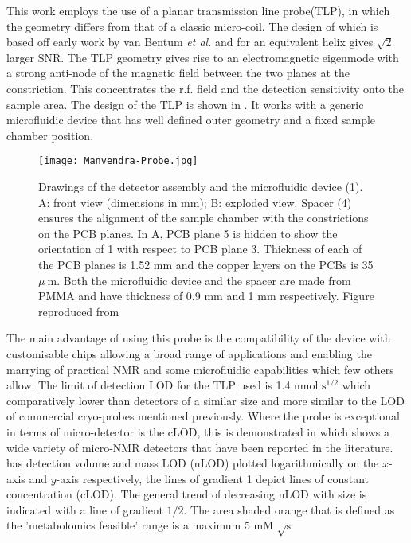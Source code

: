 This work employs the use of a planar transmission line probe(TLP)\citep{Finch:2016gv, RN164}, in which the geometry
differs from that of a classic micro-coil. The design of which is based off early work by van Bentum \textit{et
al.} and for an equivalent helix gives $\sqrt{2}$ larger SNR\citep{vanBentum:2007fda}. The TLP geometry gives rise
to an electromagnetic eigenmode with a strong anti-node of the magnetic field between the two planes
at the constriction. This concentrates the r.f. field and the detection sensitivity onto the sample area. The design of the TLP is shown in
. It works with a generic microfluidic device that has well defined outer geometry and a fixed sample
chamber position.
\begin{figure}
  \begin{center}
  \texttt{[image: Manvendra-Probe.jpg]}
  \end{center}
  \caption{Drawings of the detector assembly and the microfluidic device (1). A: front view (dimensions in mm); B:
  exploded view. Spacer (4) ensures the alignment of the sample chamber with the constrictions on the PCB planes. In A,
  PCB plane 5 is hidden to show the orientation of 1 with respect to PCB plane 3. Thickness of each of the PCB planes
  is 1.52 mm and the copper layers on the PCBs is 35 $\mu~\text{m}$. Both the microfluidic device and the spacer are made from
  PMMA and have thickness of 0.9 mm and 1 mm respectively. Figure reproduced from\citep{RN164}}
  \label{fig:MVProbe}
\end{figure}
The main advantage of using this probe is the compatibility of the device with customisable chips allowing
a broad range of applications and enabling the marrying of practical NMR and some microfluidic capabilities which
few others allow\citep{RN165,RN166,RN167}. The limit of detection LOD for the TLP used is
1.4 nmol $\text{s}^{1/2}$ which comparatively lower than detectors of a similar size and more similar to the LOD of
commercial cryo-probes mentioned previously. Where the probe is exceptional in terms of micro-detector is
the cLOD, this is demonstrated in  which shows a wide variety of micro-NMR detectors that have been reported in the literature.  has detection volume and mass LOD (nLOD) plotted logarithmically
on the $x$-axis and $y$-axis respectively, the lines of gradient 1 depict lines of constant concentration (cLOD). The general trend of decreasing nLOD with size is indicated with a line of gradient $1/2$. The area shaded orange that is defined as the 'metabolomics feasible' range is a maximum 5 mM $\sqrt{\text{s}}$
